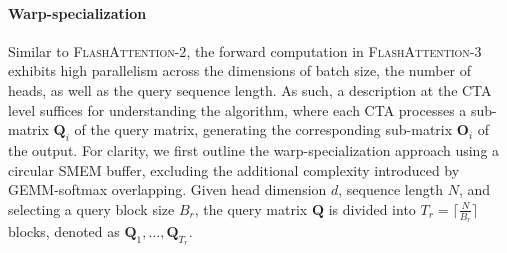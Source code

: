 \paragraph{Warp-specialization}
Similar to \textsc{FlashAttention-2}, the forward computation in \textsc{FlashAttention-3} exhibits high parallelism across the dimensions of batch size, the number of heads, as well as the query sequence length. As such, a description at the CTA level suffices for understanding the algorithm, where each CTA processes a sub-matrix $\mathbf{Q}_i$ of the query matrix, generating the corresponding sub-matrix $\mathbf{O}_i$ of the output. For clarity, we first outline the warp-specialization approach using a circular SMEM buffer, excluding the additional complexity introduced by GEMM-softmax overlapping. Given head dimension $d$, sequence length $N$, and selecting a query block size $B_r$, the query matrix $\mathbf{Q}$ is divided into $T_r = \lceil \frac{N}{B_r} \rceil$ blocks, denoted as $\mathbf{Q}_1, ..., \mathbf{Q}_{T_r}$.

